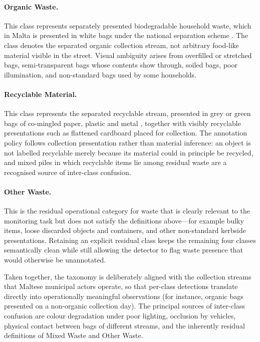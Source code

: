 \paragraph{Organic Waste.} This class represents separately presented biodegradable household waste, which in Malta is presented in white bags under the national separation scheme \citep{wastecollection2026web,era2023web}. The class denotes the separated organic collection stream, not arbitrary food-like material visible in the street. Visual ambiguity arises from overfilled or stretched bags, semi-transparent bags whose contents show through, soiled bags, poor illumination, and non-standard bags used by some households.

\paragraph{Recyclable Material.} This class represents the separated recyclable stream, presented in grey or green bags of co-mingled paper, plastic and metal \citep{wastecollection2026web}, together with visibly recyclable presentations such as flattened cardboard placed for collection. The annotation policy follows collection presentation rather than material inference: an object is not labelled recyclable merely because its material could in principle be recycled, and mixed piles in which recyclable items lie among residual waste are a recognised source of inter-class confusion.

\paragraph{Other Waste.} This is the residual operational category for waste that is clearly relevant to the monitoring task but does not satisfy the definitions above---for example bulky items, loose discarded objects and containers, and other non-standard kerbside presentations. Retaining an explicit residual class keeps the remaining four classes semantically clean while still allowing the detector to flag waste presence that would otherwise be unannotated.

Taken together, the taxonomy is deliberately aligned with the collection streams that Maltese municipal actors operate, so that per-class detections translate directly into operationally meaningful observations (for instance, organic bags presented on a non-organic collection day). The principal sources of inter-class confusion are colour degradation under poor lighting, occlusion by vehicles, physical contact between bags of different streams, and the inherently residual definitions of Mixed Waste and Other Waste.

